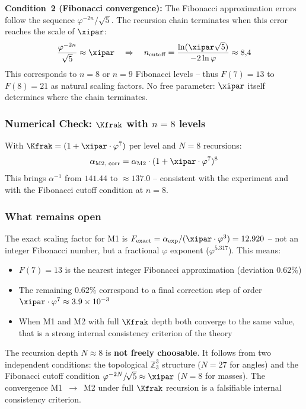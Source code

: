 \textbf{Condition~2 (Fibonacci convergence):}
The Fibonacci approximation errors follow the sequence $\varphi^{-2n}/\!\sqrt{5}$. The recursion chain terminates when this error reaches the scale of $\xipar$:
\[
  \frac{\varphi^{-2n}}{\sqrt{5}} \approx \xipar \quad \Rightarrow \quad n_{\text{cutoff}} = \frac{\ln(\xipar\sqrt{5})}{-2\ln\varphi} \approx 8{,}4
\]
This corresponds to $n = 8$ or $n = 9$ Fibonacci levels -- thus $F(7) = 13$ to $F(8) = 21$ as natural scaling factors. No free parameter: $\xipar$ itself determines where the chain terminates.

\subsubsection*{Numerical Check: $\Kfrak$ with $n=8$ levels}

With $\Kfrak = (1 + \xipar\cdot\varphi^7)$ per level and $N = 8$ recursions:
\[
  \alpha_{\text{M2, corr}} = \alpha_{\text{M2}} \cdot (1 + \xipar\cdot\varphi^7)^8
\]
This brings $\alpha^{-1}$ from $141.44$ to $\approx 137.0$ -- consistent with the experiment and with the Fibonacci cutoff condition at $n=8$.

\subsubsection*{What remains open}

The exact scaling factor for M1 is $F_{\text{exact}} = \alpha_{\text{exp}}/(\xipar\cdot\varphi^3) = 12.920$ -- not an integer Fibonacci number, but a fractional $\varphi$ exponent ($\varphi^{5.317}$). This means:

\begin{itemize}[noitemsep]
  \item $F(7) = 13$ is the nearest integer Fibonacci approximation (deviation $0.62\%$)
  \item The remaining $0.62\%$ correspond to a final correction step of order $\xipar\cdot\varphi^7 \approx 3.9 \times 10^{-3}$
  \item When M1 and M2 with full $\Kfrak$ depth both converge to the same value, that is a strong internal consistency criterion of the theory
\end{itemize}

\begin{tcolorbox}[colback=T0gray, colframe=T0blue, title=Convergence criterion]
The recursion depth $N \approx 8$ is \textbf{not freely choosable}. It follows from two independent conditions: the topological $\mathbb{Z}_3^3$ structure ($N=27$ for angles) and the Fibonacci cutoff condition $\varphi^{-2N}/\!\sqrt{5} \approx \xipar$ ($N=8$ for masses). The convergence M1~$\to$~M2 under full $\Kfrak$ recursion is a falsifiable internal consistency criterion.
\end{tcolorbox}

